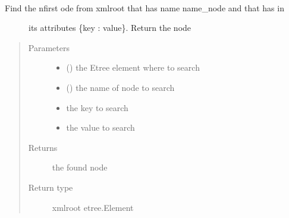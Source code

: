 \documentclass[a4paper,10pt,english]{sphinxmanual}
\begin{document}
\begin{fulllineitems}
\label{\detokenize{commands/apidoc/src:src.xmlManager.find_node_by_attrib}}~\begin{description}
\item[{Find the nfirst ode from xmlroot that has name name\_node and that has in }] \leavevmode
its attributes \{key : value\}. Return the node

\end{description}
\begin{quote}\begin{description}
\item[{Parameters}] \leavevmode\begin{itemize}
\item {} 
 () \textendash{} the Etree element where to search

\item {} 
 () \textendash{} the name of node to search

\item {} 
 \textendash{} the key to search

\item {} 
 \textendash{} the value to search

\end{itemize}

\item[{Returns}] \leavevmode
the found node

\item[{Return type}] \leavevmode
xmlroot etree.Element

\end{description}\end{quote}

\end{fulllineitems}

\end{document}
